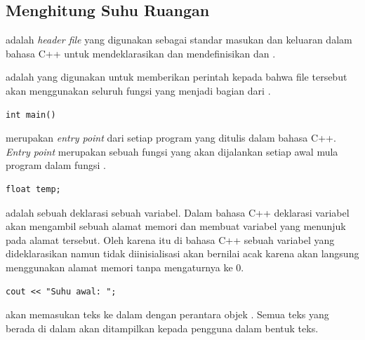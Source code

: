 \documentclass[../main.tex]{subfiles}
\begin{document}
    \subsection{Menghitung Suhu Ruangan}
    

    \ilz{}{\Script}  adalah \textit{header file} yang digunakan sebagai standar masukan dan keluaran dalam bahasa C++ untuk mendeklarasikan dan mendefinisikan {\statement}  dan .

    \vspace{-0.5ex}
    
    \vspace{-0.5ex}

    \ilz{}{\Script}  adalah {\statement} yang digunakan untuk memberikan perintah kepada {\compiler} bahwa file tersebut akan menggunakan seluruh fungsi yang menjadi bagian dari .

\begin{lstlisting}
int main()
\end{lstlisting}

    \ilz{}{\Script}  merupakan \textit{entry point} dari setiap program yang ditulis dalam bahasa C++. \textit{Entry point} merupakan sebuah fungsi yang akan dijalankan setiap awal mula program dalam fungsi .

    \begin{lstlisting}
float temp;
\end{lstlisting}

    \ilz{}{\Script}  adalah sebuah {\statement} deklarasi sebuah variabel. Dalam bahasa C++ deklarasi variabel akan mengambil sebuah alamat memori dan membuat variabel yang menunjuk pada alamat tersebut. Oleh karena itu di bahasa C++ sebuah variabel yang dideklarasikan namun tidak diinisialisasi akan bernilai acak karena akan langsung menggunakan alamat memori tanpa mengaturnya ke 0.

\begin{lstlisting}
cout << "Suhu awal: ";
\end{lstlisting}

    \ilz{}{\Script}  akan memasukan teks  ke dalam {\ioo} {\stream} dengan perantara objek . Semua teks yang berada di dalam {\ioo} {\stream} akan ditampilkan kepada pengguna dalam bentuk teks.
\end{document}
